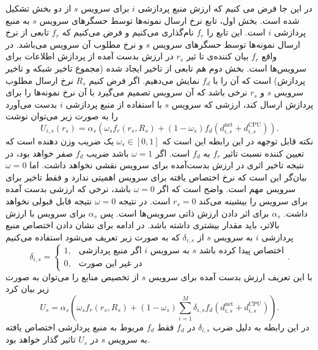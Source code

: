     در این جا فرض می کنیم که ارزش منبع پردازشی $i$ برای سرویس $s$ از دو بخش تشکیل شده است.
    بخش اول، تابع نرخ ارسال نمونه‌ها توسط حسگر‌های سرویس $s$ به منبع پردازشی $i$ است.
    این تابع را $f_r$ نام‌گذاری می‌کنیم و فرض می‌کنیم که $f_r$ تابعی از نرخ ارسال نمونه‌ها توسط حسگر‌های سرویس $s$ و نرخ مطلوب آن سرویس می‌باشد.
    در واقع $f_r$ بیان کننده‌ی تا ثیر $r_s$ در ارزش بدست آمده از پردازش اطلاعات برای سرویس‌ها است.
    بخش دوم هم تابعی از تاخیر ایجاد شده (مجموع تاخیر شبکه و تاخیر پردازش) است که آن را با $f_d$ نمایش می‌دهیم.
    اگر فرض کنیم $R_s$ نرخ ارسال مطلوب سرویس $s$ و $r_s$ نرخی باشد که آن سرویس تصمیم می‌گیرد با آن نرخ نمونه‌ها را برای پردازش ارسال کند، ارزشی که سرویس $s$ با استفاده از منبع پردازشی $i$ بدست می‌آورد را به صورت زیر می‌توان نوشت
    \begin{equation}
      U_{i,s}(r_s) = \alpha_s \left (\omega_s f_r(r_s, R_s) + (1-\omega_s) f_d(d_{i,s}^{\text{net}} + d_{i,s}^{\text{CPU}}) \right ) .
    \end{equation}
    نکته قابل توجهه در این رابطه این است که $\omega_s \in [0,1]$ یک ضریب وزن دهنده است که تعیین کننده نسبت تاثیر $f_r$ به $f_d$ است.
    اگر $\omega = 1$ باشد ضریب $f_d$ صفر خواهد بود، در نتیجه تاخیر اثری در ارزش بدست‌آمده برای سرویس نقشی نخواهد داشت.
    اما $\omega = 0$ بیان‌گر این است که نرخ اختصاص یافته برای سرویس اهمیتی ندارد و فقط تاخیر برای سرویس مهم است.
    واضح است که اگر $\omega = 0$ باشد، نرخی که ارزشی بدست آمده برای سرویس را بیشینه می‌کند $r_s = 0$ است.
    در نتیجه $\omega = 0$ نتیجه قابل قبولی نخواهد داشت.
    $\alpha_s$ برای اثر دادن ارزش ذاتی سرویس‌ها است.
    پس $\alpha_s$ برای سرویس با ارزش بالاتر، باید مقدار بیشتری داشته باشد.
    در ادامه برای نشان دادن اختصاص منبع پردازشی $i$ به سرویس $s$ از $\delta_{i,s}$ که به صورت زیر تعریف می‌شود استفاده می‌کنیم
    \begin{equation*}
      \delta_{i,s} = 
      \begin{cases}
        1, & \text{اگر منبع پردازشی $i$ به سرویس $s$ اختصاص پیدا کرده باشد} \\
        0, & \text{در غیر این صورت}
      \end{cases}.
    \end{equation*}
    با این تعریف ارزش بدست آمده برای سرویس $s$ از تخصیص منابع را می‌توان به صورت زیر بیان کرد
    \begin{equation}
      U_{s} =  \alpha_s \left (\omega_s  f_r(r_s, R_s) + (1-\omega_s) \sum_{i=1}^M \delta_{i,s} f_d(d_{i,s}^{\text{net}} + d_{i,s}^{\text{CPU}}) \right).
    \end{equation}
    در این رابطه به دلیل ضرب $\delta_{i,s}$ در $f_d$ فقط $f_d$ مربوط به منبع پردازشی اختصاص یافته به سرویس $s$ در $U_s$ تاثیر گذار خواهد بود.


